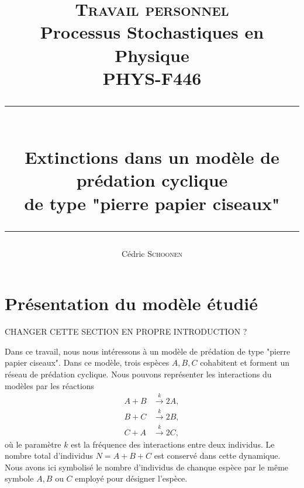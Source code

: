 \documentclass[openany,a4paper,12pt]{article}
\title{
\textsc{Travail personnel}\\ 
Processus Stochastiques en Physique\\
PHYS-F446\\
\rule{\linewidth}{1pt} \\
\vspace{3mm}
Extinctions dans un modèle de prédation cyclique \\
de type "pierre papier ciseaux"\\
\rule{\linewidth}{1pt}
}
\author{Cédric \textsc{Schoonen}}
\begin{document}
\maketitle
\vspace{2cm}

\tableofcontents

\newpage





\section{Présentation du modèle étudié}

{\color{red} CHANGER CETTE SECTION EN PROPRE INTRODUCTION ?}

\par Dans ce travail, nous nous intéressons à un modèle de prédation de type "pierre papier ciseaux". Dans ce modèle, trois espèces $A,B,C$ cohabitent et forment un réseau de prédation cyclique. Nous pouvons représenter les interactions du modèles par les réactions
%
\begin{equation}\label{reactions_k}
\begin{split}
	A + B & \overset{k}{\longrightarrow} 2A, \\
	B + C & \overset{k}{\longrightarrow} 2B, \\
	C + A & \overset{k}{\longrightarrow} 2C, 
\end{split}
\end{equation}
%
où le paramètre $k$ est la fréquence des interactions entre deux individus. Le nombre total d'individus $N=A+B+C$ est conservé dans cette dynamique. Nous avons ici symbolisé le nombre d'individus de chanque espèce par le même symbole $A,B$ ou $C$ employé pour désigner l'espèce.
\end{document}
